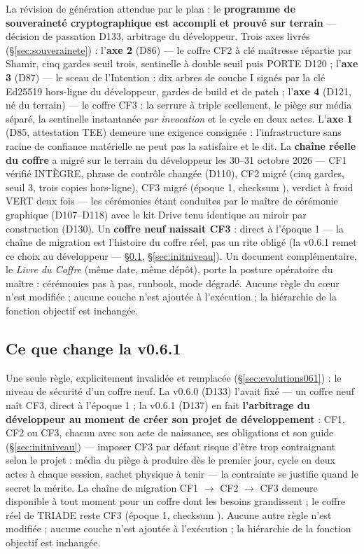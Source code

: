 La révision de génération attendue par le plan : le \textbf{programme de souveraineté
cryptographique est accompli et prouvé sur terrain} — décision de passation D133,
arbitrage du développeur. Trois axes livrés (§\ref{sec:souverainete}) : l'\textbf{axe 2}
(D86) — le coffre CF2 à clé maîtresse répartie par Shamir, cinq gardes seuil trois,
sentinelle à double seuil puis PORTE D120 ; l'\textbf{axe 3} (D87) — le sceau de
l'Intention : dix arbres de couche I signés par la clé Ed25519 hors-ligne du
développeur, gardes de build et de patch ; l'\textbf{axe 4} (D121, né du terrain) — le
coffre CF3 : la serrure à triple scellement, le piège sur média séparé, la sentinelle
instantanée \emph{par invocation} et le cycle en deux actes. L'\textbf{axe 1} (D85,
attestation TEE) demeure une exigence consignée : l'infrastructure sans racine de
confiance matérielle ne peut pas la satisfaire et le dit. La \textbf{chaîne réelle du
coffre} a migré sur le terrain du développeur les 30--31 octobre 2026 — CF1 vérifié
INTÈGRE, phrase de contrôle changée (D110), CF2 migré (cinq gardes, seuil 3, trois
copies hors-ligne), CF3 migré (époque 1, checksum ), verdict à froid
VERT deux fois — les cérémonies étant conduites par le maître de cérémonie graphique
(D107--D118) avec le kit Drive tenu identique au miroir par construction (D130). Un
\textbf{coffre neuf naissait CF3} :  direct à l'époque 1 — la chaîne
de migration est l'histoire du coffre réel, pas un rite obligé (la v0.6.1 remet ce
choix au développeur — §\ref{sec:nouveautes061}, §\ref{sec:initniveau}). Un document
complémentaire, le \emph{Livre du Coffre} (même date, même dépôt), porte la posture
opératoire du maître : cérémonies pas à pas, runbook, mode dégradé. Aucune règle du
cœur n'est modifiée ; aucune couche n'est ajoutée à l'exécution ; la hiérarchie de la
fonction objectif est inchangée.

\subsection{Ce que change la v0.6.1}\label{sec:nouveautes061}

Une seule règle, explicitement invalidée et remplacée (§\ref{sec:evolutions061}) :
le niveau de sécurité d'un coffre neuf. La v0.6.0 (D133) l'avait fixé — un coffre
neuf naît CF3,  direct à l'époque 1 ; la v0.6.1 (D137) en fait
\textbf{l'arbitrage du développeur au moment de créer son projet de développement} :
CF1, CF2 ou CF3, chacun avec son acte de naissance, ses obligations et son guide
(§\ref{sec:initniveau}) — imposer CF3 par défaut risque d'être trop contraignant
selon le projet : média du piège à produire dès le premier jour, cycle en deux actes
à chaque session, sachet physique à tenir — la contrainte se justifie quand le secret
la mérite. La chaîne de migration CF1 $\to$ CF2 $\to$ CF3 demeure disponible à tout
moment pour un coffre dont les besoins grandissent ; le coffre réel de TRIADE reste
CF3 (époque 1, checksum ). Aucune autre règle n'est modifiée ; aucune
couche n'est ajoutée à l'exécution ; la hiérarchie de la fonction objectif est
inchangée.

